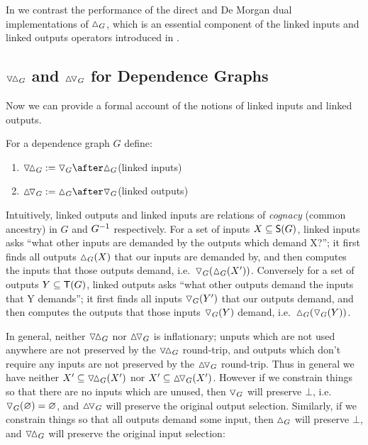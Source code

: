 

\noindent In  we contrast the performance of the direct and De Morgan dual implementations
of $\demandedByR_{G}$, which is an essential component of the linked inputs and linked outputs operators
introduced in .

\subsection{$\relInputR_G$ and $\relOutputR_G$ for Dependence Graphs}

Now we can provide a formal account of the notions of linked inputs and linked outputs.

\begin{definition}
   For a dependence graph $G$ define:
   \begin{enumerate}
      \item $\relInputR_{G} \eqdef \demandsR_{G} \after \demandedByR_{G}$\hfill (linked inputs)
      \item $\relOutputR_{G} \eqdef \demandedByR_{G} \after \demandsR_{G}$\hfill (linked outputs)
   \end{enumerate}
\end{definition}

Intuitively, linked outputs and linked inputs are relations of \emph{cognacy} (common ancestry) in $G$ and
$G^{-1}$ respectively. For a set of inputs $X \subseteq \mathsf{S}(G)$, linked inputs asks ``what other
inputs are demanded by the outputs which demand X?''; it first finds all outputs $\demandedByR_{G}(X)$ that
our inputs are demanded by, and then computes the inputs that those outputs demand,
i.e.~$\demandsR_{G}(\demandedByR_{G}(X'))$. Conversely for a set of outputs $Y \subseteq \mathsf{T}(G)$, linked outputs asks
``what other outputs demand the inputs that Y demands''; it first finds all inputs $\triangledown_{G}(Y')$ that
our outputs demand, and then computes the outputs that those inputs $\triangledown_{G}(Y)$ demand,
i.e.~$\demandedByR_{G}(\demandsR_{G}(Y))$.

In general, neither $\relInputR_{G}$ nor $\relOutputR_{G}$ is inflationary; unputs which are not used anywhere
are not preserved by the $\relInputR_{G}$ round-trip, and outputs which don't require any inputs are not
preserved by the $\relOutputR_{G}$ round-trip.  Thus in general we have
neither $X' \subseteq \relInputR_{G}(X')$ nor $X' \subseteq \relOutputR_{G}(X')$. However if we constrain
things so that there are no inputs which are unused, then $\triangledown_G$ will preserve $\bot$,
i.e.~$\triangledown_G(\varnothing) = \varnothing$, and $\relOutputR_{G}$ will preserve the original output selection.
Similarly, if we constrain things so that all outputs demand some input, then $\demandedByR_G$ will preserve
$\bot$, and $\relInputR_{G}$ will preserve the original input selection:

